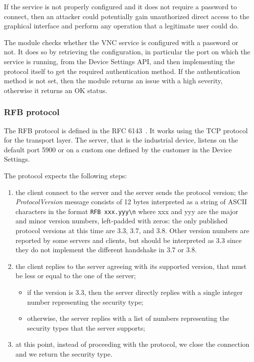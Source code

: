 If the service is not properly configured and it does not require a password to connect, then an attacker could potentially gain unauthorized direct access to the graphical interface and perform any operation that a legitimate user could do.

The module checks whether the VNC service is configured with a password or not. It does so by retrieving the configuration, in particular the port on which the service is running, from the Device Settings API, and then implementing the protocol itself to get the required authentication method. If the authentication method is not set, then the module returns an issue with a high severity, otherwise it returns an OK status.

\subsubsection{RFB protocol}

The RFB protocol is defined in the RFC 6143~\cite{rfc6143}. It works using the TCP protocol for the transport layer. The server, that is the industrial device, listens on the default port 5900 or on a custom one defined by the customer in the Device Settings.

The protocol expects the following steps:

\begin{enumerate}
  \item the client connect to the server and the server sends the protocol version; the \textit{ProtocolVersion} message consists of 12 bytes interpreted as a string of ASCII characters in the format \texttt{RFB xxx.yyy\textbackslash n} where xxx and yyy are the major and minor version numbers, left-padded with zeros: the only published protocol versions at this time are 3.3, 3.7, and 3.8. Other version numbers are reported by some servers and clients, but should be interpreted as 3.3 since they do not implement the different handshake in 3.7 or 3.8.
  \item the client replies to the server agreeing with its supported version, that must be less or equal to the one of the server;
        \begin{itemize}
          \item if the version is 3.3, then the server directly replies with a single integer number representing the security type;
          \item otherwise, the server replies with a list of numbers representing the security types that the server supports;
        \end{itemize}
  \item at this point, instead of proceeding with the protocol, we close the connection and we return the security type.
\end{enumerate}

